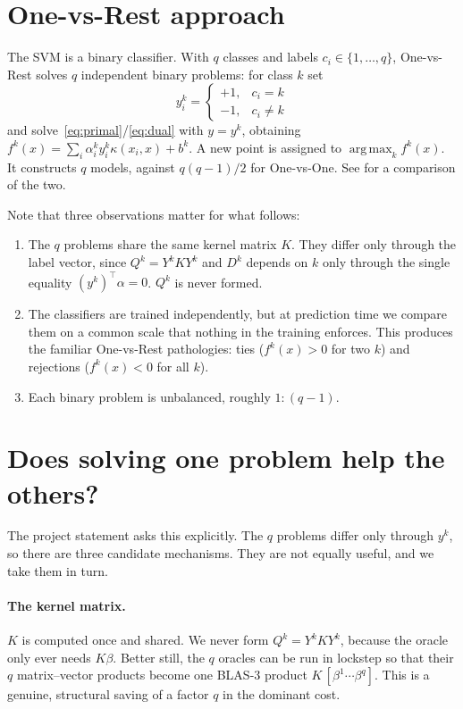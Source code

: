 \documentclass[11pt,a4paper]{report}
\DeclareMathOperator*{\argmax}{arg\,max}
\begin{document}
\section{One-vs-Rest approach}

The SVM is a binary classifier. With $q$ classes and labels
$c_i\in\{1,\dots,q\}$, One-vs-Rest solves $q$ independent binary problems: for class
$k$ set
\[
y^k_i=\begin{cases}+1,&c_i=k\\ -1,&c_i\neq k\end{cases}
\]
and solve~\eqref{eq:primal}/\eqref{eq:dual} with $y=y^k$, obtaining
$f^k(x)=\sum_i\alpha^k_iy^k_i\kappa(x_i,x)+b^k$. A new point is assigned to
$\argmax_k f^k(x)$. It constructs $q$ models, against $q(q-1)/2$ for One-vs-One. See \cite{HsuLin02} for
a comparison of the two.

Note that three observations matter for what follows:
\begin{enumerate}
\item The $q$ problems share the same kernel matrix $K$. They differ only through
      the label vector, since $Q^k=Y^kKY^k$ and $D^k$ depends on $k$ only
      through the single equality $(y^k)^{\!\top}\alpha=0$. $Q^k$ is never formed.
\item The classifiers are trained independently, but at prediction time we compare them
      on a common scale that nothing in the training enforces. This produces the
      familiar One-vs-Rest pathologies: ties ($f^k(x)>0$ for two $k$) and rejections
      ($f^k(x)<0$ for all $k$).
\item Each binary problem is unbalanced, roughly $1:(q-1)$.
\end{enumerate}

\section{Does solving one problem help the others?}
\label{sec:transfer}
The project statement asks this explicitly. The $q$ problems differ only through
$y^k$, so there are three candidate mechanisms. They are not equally useful, and we
take them in turn.

\paragraph{The kernel matrix.} $K$ is computed once and shared. We never form $Q^k=Y^kKY^k$, because the oracle only ever needs $K\beta$. Better still, the $q$ oracles
can be run in lockstep so that their $q$ matrix--vector products become one BLAS-3
product $K\,[\beta^1\cdots\beta^q]$. This is a genuine, structural saving of a factor
$q$ in the dominant cost.
\end{document}
